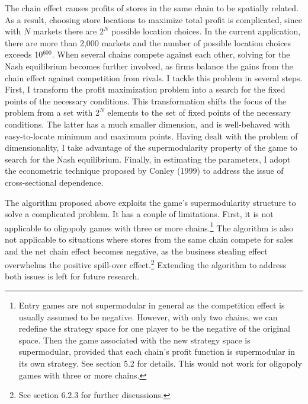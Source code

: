 \documentclass[notitlepage,onecolumn,11pt]{article}
\begin{document}
The chain effect causes profits of stores in the same chain to be spatially
related. As a result, choosing store locations to maximize total profit is
complicated, since with $N$ markets there are $2^{N}$ possible location
choices. In the current application, there are more than 2,000 markets and
the number of possible location choices exceeds 10$^{600}.$ When several
chains compete against each other, solving for the Nash equilibrium becomes
further involved, as firms balance the gains from the chain effect against
competition from rivals. I tackle this problem in several steps. First, I
transform the profit maximization problem into a search for the fixed points
of the necessary conditions. This transformation shifts the focus of the
problem from a set with $2^{N}$ elements to the set of fixed points of the
necessary conditions. The latter has a much smaller dimension, and is
well-behaved with easy-to-locate minimum and maximum points. Having dealt
with the problem of dimensionality, I take advantage of the supermodularity
property of the game to search for the Nash equilibrium. Finally, in
estimating the parameters, I adopt the econometric technique proposed by
Conley (1999) to address the issue of cross-sectional dependence.

The algorithm proposed above exploits the game's supermodularity structure
to solve a complicated problem. It has a couple of limitations. First, it is
not applicable to oligopoly games with three or more chains.\footnote{%
Entry games are not supermodular in general as the competition effect is
usually assumed to be negative. However, with only two chains, we can
redefine the strategy space for one player to be the negative of the
original space. Then the game associated with the new strategy space is
supermodular, provided that each chain's profit function is supermodular in
its own strategy. See section 5.2 for details. This would not work for
oligopoly games with three or more chains.} The algorithm is also not
applicable to situations where stores from the same chain compete for sales
and the net chain effect becomes negative, as the business stealing effect
overwhelms the positive spill-over effect.\footnote{%
See section 6.2.3 for further discussions.} Extending the algorithm to
address both issues is left for future research.
\end{document}
